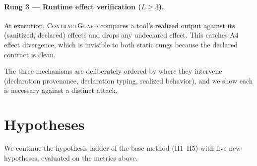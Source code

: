 \documentclass[conference,onecolumn]{IEEEtran}
\theoremstyle{definition}
\newcommand{\cg}{\textsc{ContractGuard}}
\begin{document}
\paragraph{Rung 3 --- Runtime effect verification ($L\geq 3$).}
At execution, \cg{} compares a tool's realized output against its (sanitized,
declared) effects and drops any undeclared effect. This catches A4 effect
divergence, which is invisible to both static rungs because the declared
contract is clean.

The three mechanisms are deliberately ordered by where they intervene
(declaration provenance, declaration typing, realized behavior), and we show
each is necessary against a distinct attack.

\section{Hypotheses}
\label{sec:hyp}
We continue the hypothesis ladder of the base method (H1--H5) with five new
hypotheses, evaluated on the metrics above.
\end{document}
